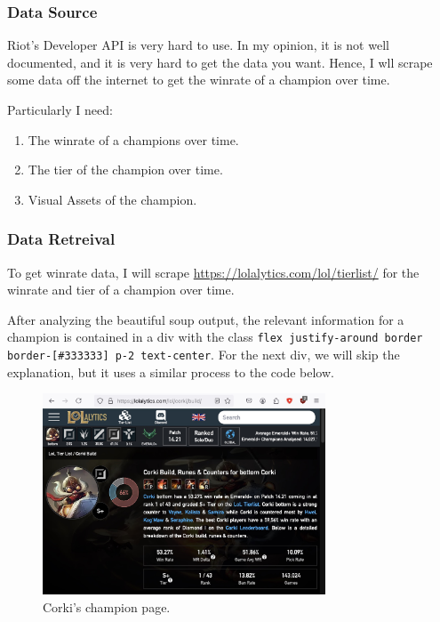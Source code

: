 \documentclass{article}
\begin{document}
\subsubsection{Data Source}
\label{subsubsec:Data Source}

Riot's Developer API is very hard to use. In my opinion, it is not well documented, and it is very hard to get the data you want.
Hence, I wll scrape some data off the internet to get the winrate of a champion over time.

Particularly I need:
\begin{enumerate}
  \item The winrate of a champions over time.
  \item The tier of the champion over time.
  \item Visual Assets of the champion.
\end{enumerate}

\subsubsection{Data Retreival} 
\label{subsubsec:Data Retreival}

To get winrate data, I will scrape \url{https://lolalytics.com/lol/tierlist/} for the winrate and tier of a champion over time.

After analyzing the beautiful soup output, the relevant information for a champion 
is contained in a div with the class \texttt{flex justify-around border border-[\#333333] p-2 text-center}.
For the next div, we will skip the explanation, but it uses a similar process to the code below.

\begin{figure}[ht] %
  \centering
  \includegraphics[width=0.75\textwidth]{figs/website.jpg}
  \caption{
      Corki's champion page.
  }
  \label{fig:fig1}
\end{figure}
\end{document}
